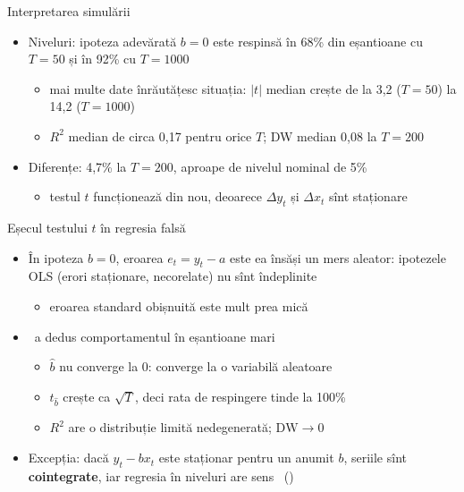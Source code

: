 \begin{frame}{Interpretarea simulării}
\itemsize{\small}
\begin{itemize}
    \item Niveluri: ipoteza adevărată $b = 0$ este respinsă în 68\% din eșantioane cu $T = 50$ și în 92\% cu $T = 1000$
    \begin{itemize}
        \item mai multe date înrăutățesc situația: $|t|$ median crește de la 3{,}2 ($T = 50$) la 14{,}2 ($T = 1000$)
        \item $R^2$ median de circa 0{,}17 pentru orice $T$; DW median 0{,}08 la $T = 200$
    \end{itemize}
    \item Diferențe: 4{,}7\% la $T = 200$, aproape de nivelul nominal de 5\%
    \begin{itemize}
        \item testul $t$ funcționează din nou, deoarece $\Delta y_t$ și $\Delta x_t$ sînt staționare
    \end{itemize}
\end{itemize}
\end{frame}

\begin{frame}{Eșecul testului $t$ în regresia falsă}
\itemsize{\small}
\begin{itemize}
    \item În ipoteza $b = 0$, eroarea $e_t = y_t - a$ este ea însăși un mers aleator: ipotezele OLS (erori staționare, necorelate) nu sînt îndeplinite
    \begin{itemize}
        \item eroarea standard obișnuită este mult prea mică
    \end{itemize}
    \item {}\ a dedus comportamentul în eșantioane mari
    \begin{itemize}
        \item $\hat b$ nu converge la 0: converge la o variabilă aleatoare
        \item $t_{\hat b}$ crește ca $\sqrt{T}$, deci rata de respingere tinde la 100\%
        \item $R^2$ are o distribuție limită nedegenerată; $\mathrm{DW} \to 0$
    \end{itemize}
    \item Excepția: dacă $y_t - b x_t$ este staționar pentru un anumit $b$, seriile sînt \textbf{cointegrate}, iar regresia în niveluri are sens \ ()
\end{itemize}
\end{frame}

